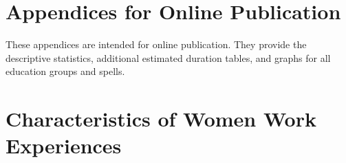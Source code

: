 \documentclass[12pt,letterpaper]{article}
\begin{document}
\clearpage

\onehalfspacing






\clearpage
\newpage

\appendix

\renewcommand\thefigure{\thesection.\arabic{figure}}    
\renewcommand\thetable{\thesection.\arabic{table}}    

\section*{Appendices for Online Publication}

These appendices are intended for online publication.
They provide the descriptive statistics, additional
estimated duration tables, and graphs for all 
education groups and spells.

\clearpage
\newpage

\section{Characteristics of Women Work Experiences}

\setcounter{figure}{0}
\setcounter{table}{0}
\end{document}
